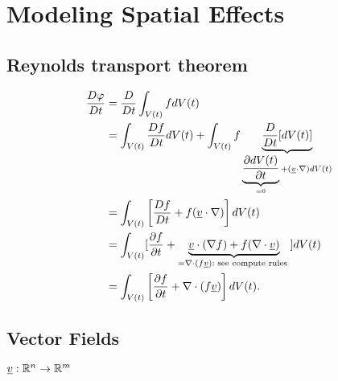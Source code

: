 \section{Modeling Spatial Effects}

\subsection*{Reynolds transport theorem}

\begin{align*}
 \frac{D \varphi}{D t} & =\frac{D}{D t} \int_{V(t)} f d V(t) \\
& =\int_{V(t)} \frac{D f}{D t} d V(t)+\int_{V(t)} f \underbrace{\frac{D}{D t}[d V(t)]}_{
	\underbrace{\frac{\partial d V(t)}{\partial t}}_{= 0}
	+(\underline{v} \cdot \nabla) d V(t) 
 }\\
& =\int_{V(t)}\left[\frac{D f}{D t}+f(\underline{v} \cdot \nabla)\right] d V(t) \\
& =\int_{V(t)}[\frac{\partial f}{\partial t}+\underbrace{\underline{v} \cdot(\nabla f)+f(\nabla \cdot \underline{v})}_{
	=\nabla \cdot(f \underline{v}): \text { see compute rules }}] d V(t) \\
& =\int_{V(t)}\left[\frac{\partial f}{\partial t}+\nabla \cdot(f \underline{v})\right] d V(t) \text {. } \\
\end{align*}


\subsection*{Vector Fields}
$\underline{v} : \mathbb{R}^n \to \mathbb{R}^m$



